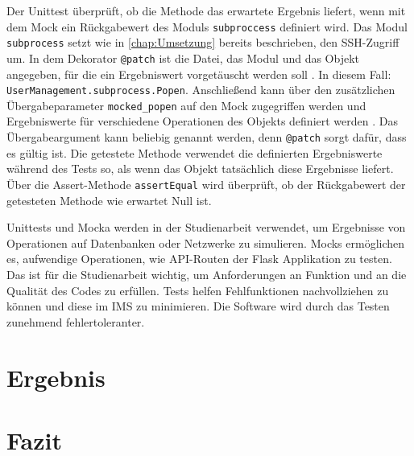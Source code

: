\documentclass[a4paper,titlepage,halfparskip,12pt]{scrreprt}
\begin{document}
\begin{onehalfspacing}
Der Unittest überprüft, ob die Methode das erwartete Ergebnis liefert, wenn mit dem Mock ein Rückgabewert des Moduls \texttt{subproccess} definiert wird. Das Modul \texttt{subprocess} setzt wie in \autoref{chap:Umsetzung} bereits beschrieben, den \acs{SSH}-Zugriff um. In dem Dekorator \texttt{@patch} ist die Datei, das Modul und das Objekt angegeben, für die ein Ergebniswert vorgetäuscht werden soll \cite{hubertz2016softwaretests}. In diesem Fall: \texttt{UserManagement.subprocess.Popen}. Anschließend kann über den zusätzlichen Übergabeparameter \texttt{mocked\_popen} auf den Mock zugegriffen werden und Ergebniswerte für verschiedene Operationen des Objekts definiert werden \cite{hubertz2016softwaretests}. Das Übergabeargument kann beliebig genannt werden, denn \texttt{@patch} sorgt dafür, dass es gültig ist. Die getestete Methode verwendet die definierten Ergebniswerte während des Tests so, als wenn das Objekt tatsächlich diese Ergebnisse liefert. Über die Assert-Methode \texttt{assertEqual} wird überprüft, ob der Rückgabewert der getesteten Methode wie erwartet Null ist.

\pagebreak

Unittests und Mocka werden in der Studienarbeit verwendet, um Ergebnisse von Operationen auf Datenbanken oder Netzwerke zu simulieren. Mocks ermöglichen es, aufwendige Operationen, wie \acs{API}-Routen der Flask Applikation zu testen. Das ist für die Studienarbeit wichtig, um Anforderungen an Funktion und an die Qualität des Codes zu erfüllen. Tests helfen Fehlfunktionen nachvollziehen zu können und diese im \acs{IMS} zu minimieren. Die Software wird durch das Testen zunehmend fehlertoleranter.

\pagebreak

\chapter{Ergebnis}
\label{chap:Ergebnis}

\newpage

\chapter{Fazit}
\label{chap:Fazit}


\end{onehalfspacing}
\newpage


\newpage
\appendix
{}
\end{document}
